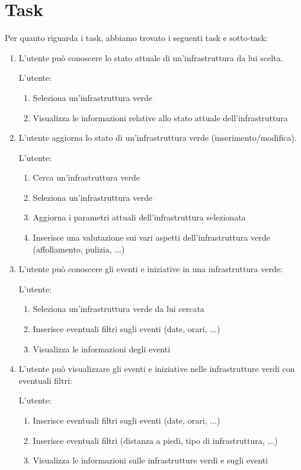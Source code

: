 \section{Task}
Per quanto riguarda i task, abbiamo trovato i seguenti task e sotto-task:
\begin{enumerate}
    \item[1.] L’utente può conoscere lo stato attuale di un’infrastruttura da lui scelta. 

    L’utente:
    \begin{enumerate}
        \item Seleziona un’infrastruttura verde
        \item Visualizza le informazioni relative allo stato attuale dell’infrastruttura
    \end{enumerate}

    \item[1.1.] L’utente aggiorna lo stato di un’infrastruttura verde (inserimento/modifica).
    
	L’utente:
    \begin{enumerate}
        \item Cerca un’infrastruttura verde
        \item Seleziona un’infrastruttura verde
        \item Aggiorna i parametri attuali dell’infrastruttura selezionata
        \item Inserisce una valutazione sui vari aspetti dell’infrastruttura verde (affollamento, pulizia, ...)
    \end{enumerate}

    \item[2.] L’utente può conoscere gli eventi e iniziative in una infrastruttura verde:
    
    L’utente:
    \begin{enumerate}
        \item Seleziona un’infrastruttura verde da lui cercata
        \item Inserisce eventuali filtri sugli eventi (date, orari, ...)
        \item Visualizza le informazioni degli eventi
    \end{enumerate}

    \item[2.1.] L’utente può visualizzare gli eventi e iniziative nelle infrastrutture verdi con eventuali filtri:
    
    L’utente:
    \begin{enumerate}
        \item Inserisce eventuali filtri sugli eventi (date, orari, ...)
        \item Inserisce eventuali filtri (distanza a piedi, tipo di infrastruttura, ...)
        \item Visualizza le informazioni sulle infrastrutture verdi e sugli eventi
    \end{enumerate}
    

\end{enumerate}
